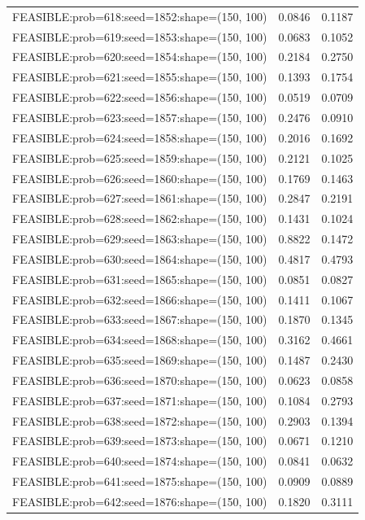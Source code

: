 \begin{longtable}{lcc}
FEASIBLE:prob=618:seed=1852:shape=(150, 100) &   0.0846 & 0.1187 \\
FEASIBLE:prob=619:seed=1853:shape=(150, 100) &   0.0683 & 0.1052 \\
FEASIBLE:prob=620:seed=1854:shape=(150, 100) &   0.2184 & 0.2750 \\
FEASIBLE:prob=621:seed=1855:shape=(150, 100) &   0.1393 & 0.1754 \\
FEASIBLE:prob=622:seed=1856:shape=(150, 100) &   0.0519 & 0.0709 \\
FEASIBLE:prob=623:seed=1857:shape=(150, 100) &   0.2476 & 0.0910 \\
FEASIBLE:prob=624:seed=1858:shape=(150, 100) &   0.2016 & 0.1692 \\
FEASIBLE:prob=625:seed=1859:shape=(150, 100) &   0.2121 & 0.1025 \\
FEASIBLE:prob=626:seed=1860:shape=(150, 100) &   0.1769 & 0.1463 \\
FEASIBLE:prob=627:seed=1861:shape=(150, 100) &   0.2847 & 0.2191 \\
FEASIBLE:prob=628:seed=1862:shape=(150, 100) &   0.1431 & 0.1024 \\
FEASIBLE:prob=629:seed=1863:shape=(150, 100) &   0.8822 & 0.1472 \\
FEASIBLE:prob=630:seed=1864:shape=(150, 100) &   0.4817 & 0.4793 \\
FEASIBLE:prob=631:seed=1865:shape=(150, 100) &   0.0851 & 0.0827 \\
FEASIBLE:prob=632:seed=1866:shape=(150, 100) &   0.1411 & 0.1067 \\
FEASIBLE:prob=633:seed=1867:shape=(150, 100) &   0.1870 & 0.1345 \\
FEASIBLE:prob=634:seed=1868:shape=(150, 100) &   0.3162 & 0.4661 \\
FEASIBLE:prob=635:seed=1869:shape=(150, 100) &   0.1487 & 0.2430 \\
FEASIBLE:prob=636:seed=1870:shape=(150, 100) &   0.0623 & 0.0858 \\
FEASIBLE:prob=637:seed=1871:shape=(150, 100) &   0.1084 & 0.2793 \\
FEASIBLE:prob=638:seed=1872:shape=(150, 100) &   0.2903 & 0.1394 \\
FEASIBLE:prob=639:seed=1873:shape=(150, 100) &   0.0671 & 0.1210 \\
FEASIBLE:prob=640:seed=1874:shape=(150, 100) &   0.0841 & 0.0632 \\
FEASIBLE:prob=641:seed=1875:shape=(150, 100) &   0.0909 & 0.0889 \\
FEASIBLE:prob=642:seed=1876:shape=(150, 100) &   0.1820 & 0.3111 \\

\end{longtable}
